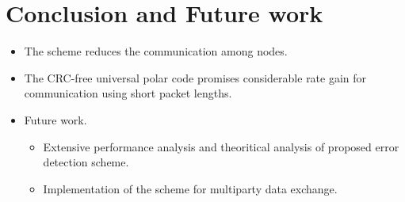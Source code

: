 \documentclass[
11pt, %
a4paper, %
oneside, %
headinclude,footinclude, %
BCOR5mm, %
]{scrartcl}
\begin{document}
\section*{Conclusion and Future work}\label{future}
\begin{itemize}
\item The scheme reduces the communication among nodes.
\item The CRC-free universal polar code promises considerable rate gain for communication using short packet lengths. 
\end{itemize}
\begin{itemize}
\item Future work.
\begin{itemize}
\item Extensive performance analysis and theoritical analysis of proposed error detection scheme. 
\item Implementation of the scheme for multiparty data exchange.
\end{itemize}
\end{itemize}




\clearpage




\end{document}
